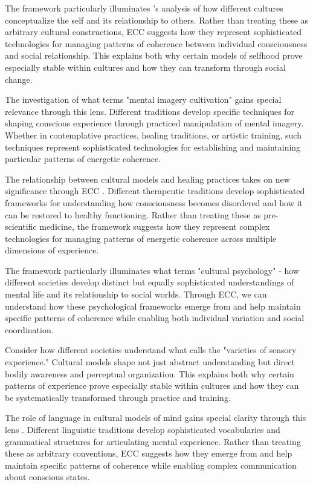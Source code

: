 \begin{refsection}
The framework particularly illuminates \cite{myers1986pintupi}'s analysis of how different cultures conceptualize the self and its relationship to others. Rather than treating these as arbitrary cultural constructions, ECC suggests how they represent sophisticated technologies for managing patterns of coherence between individual consciousness and social relationship. This explains both why certain models of selfhood prove especially stable within cultures and how they can transform through social change.

The investigation of what \cite{noll1985mental} terms "mental imagery cultivation" gains special relevance through this lens. Different traditions develop specific techniques for shaping conscious experience through practiced manipulation of mental imagery. Whether in contemplative practices, healing traditions, or artistic training, such techniques represent sophisticated technologies for establishing and maintaining particular patterns of energetic coherence.

The relationship between cultural models and healing practices takes on new significance through ECC \cite{csordas1994sacred}. Different therapeutic traditions develop sophisticated frameworks for understanding how consciousness becomes disordered and how it can be restored to healthy functioning. Rather than treating these as pre-scientific medicine, the framework suggests how they represent complex technologies for managing patterns of energetic coherence across multiple dimensions of experience.

The framework particularly illuminates what \cite{shweder1991thinking} terms "cultural psychology" - how different societies develop distinct but equally sophisticated understandings of mental life and its relationship to social worlds. Through ECC, we can understand how these psychological frameworks emerge from and help maintain specific patterns of coherence while enabling both individual variation and social coordination.

Consider how different societies understand what \cite{desjarlais1992body} calls the "varieties of sensory experience." Cultural models shape not just abstract understanding but direct bodily awareness and perceptual organization. This explains both why certain patterns of experience prove especially stable within cultures and how they can be systematically transformed through practice and training.

The role of language in cultural models of mind gains special clarity through this lens \cite{roepstorff2008things}. Different linguistic traditions develop sophisticated vocabularies and grammatical structures for articulating mental experience. Rather than treating these as arbitrary conventions, ECC suggests how they emerge from and help maintain specific patterns of coherence while enabling complex communication about conscious states.


\end{refsection}
